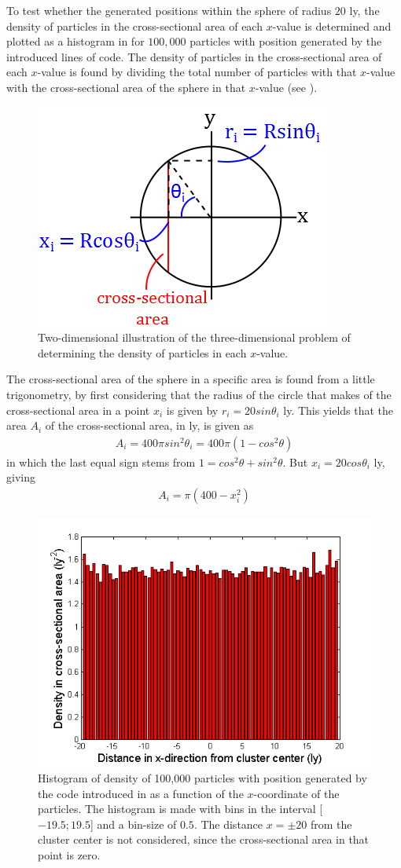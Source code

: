 To test whether the generated positions within the sphere of radius $20$ ly, the density of particles in the cross-sectional area of each $x$-value is determined and plotted as a histogram in  for $100,000$ particles with position generated by the introduced lines of code.  
The density of particles in the cross-sectional area of each $x$-value is found by dividing the total number of particles with that $x$-value with the cross-sectional area of the sphere in that $x$-value (see ).
\begin{figure}[H]
\centering
	\includegraphics[width=0.4\linewidth]{Figures/Cross_sectional_area.png}
\caption{
Two-dimensional illustration of the three-dimensional problem of determining the density of particles in each $x$-value.
}
\label{fig:Cross_sectional_area}
\end{figure}
The cross-sectional area of the sphere in a specific area is found from a little trigonometry, by first considering that the radius of the circle that makes of the cross-sectional area in a point $x_i$ is given by $r_i = 20sin\theta_i$ ly.  
This yields that the area $A_i$ of the cross-sectional area, in ly, is given as
\begin{align}
	A_i = 400\pi sin^2 \theta_i =  400\pi (1 - cos^2 \theta)
\end{align}
in which the last equal sign stems from $1 = cos^2 \theta + sin^2 \theta$.
But $x_i = 20 cos \theta_i$ ly, giving
\begin{align}
	A_i = \pi (400 - x_i^2)
\end{align}
\begin{figure}[H]
\centering
	\includegraphics[width=0.7\linewidth]{Figures/random_uniform_position_test.png}
\caption{
Histogram of density of 100,000 particles with position generated by the code introduced in  as a function of the $x$-coordinate of the particles. The histogram is made with bins in the interval [$-19.5;19.5$] and a bin-size of $0.5$. The distance $x = \pm 20$ from the cluster center is not considered, since the cross-sectional area in that point is zero.
}
\label{fig:UniformlyGeneratedPos}
\end{figure}